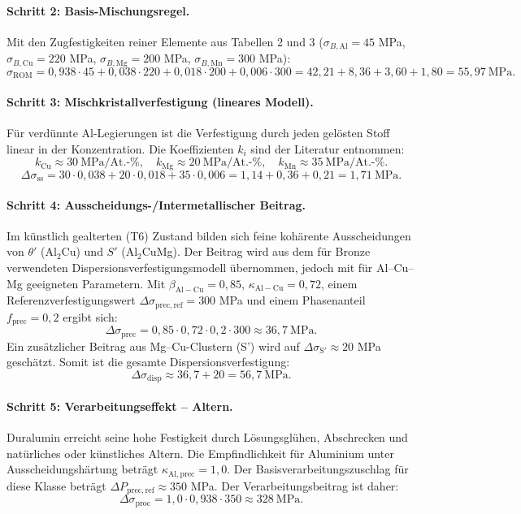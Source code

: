 \documentclass[12pt,a4paper]{article}
\begin{document}
\paragraph{Schritt 2: Basis-Mischungsregel.}
Mit den Zugfestigkeiten reiner Elemente aus Tabellen 2 und 3 (\(\sigma_{B,\mathrm{Al}}=45\) MPa, \(\sigma_{B,\mathrm{Cu}}=220\) MPa, \(\sigma_{B,\mathrm{Mg}}=200\) MPa, \(\sigma_{B,\mathrm{Mn}}=300\) MPa):
\[
\sigma_{\mathrm{ROM}} = 0,938\cdot45 + 0,038\cdot220 + 0,018\cdot200 + 0,006\cdot300
= 42,21 + 8,36 + 3,60 + 1,80 = 55,97\ \text{MPa}.
\]

\paragraph{Schritt 3: Mischkristallverfestigung (lineares Modell).}
Für verdünnte Al-Legierungen ist die Verfestigung durch jeden gelösten Stoff linear in der Konzentration. Die Koeffizienten \(k_i\) sind der Literatur entnommen:
\[
k_{\mathrm{Cu}} \approx 30\ \text{MPa/At.-\%},\quad
k_{\mathrm{Mg}} \approx 20\ \text{MPa/At.-\%},\quad
k_{\mathrm{Mn}} \approx 35\ \text{MPa/At.-\%}.
\]
\[
\Delta\sigma_{\mathrm{ss}} = 30\cdot0,038 + 20\cdot0,018 + 35\cdot0,006
= 1,14 + 0,36 + 0,21 = 1,71\ \text{MPa}.
\]

\paragraph{Schritt 4: Ausscheidungs-/Intermetallischer Beitrag.}
Im künstlich gealterten (T6) Zustand bilden sich feine kohärente Ausscheidungen von \(\theta'\) (Al\(_2\)Cu) und \(S'\) (Al\(_2\)CuMg). Der Beitrag wird aus dem für Bronze verwendeten Dispersionsverfestigungsmodell übernommen, jedoch mit für Al–Cu–Mg geeigneten Parametern. Mit \(\beta_{\mathrm{Al-Cu}}=0,85\), \(\kappa_{\mathrm{Al-Cu}}=0,72\), einem Referenzverfestigungswert \(\Delta\sigma_{\mathrm{prec,ref}}=300\) MPa und einem Phasenanteil \(f_{\mathrm{prec}}=0,2\) ergibt sich:
\[
\Delta\sigma_{\mathrm{prec}} = 0,85\cdot0,72\cdot0,2\cdot300 \approx 36,7\ \text{MPa}.
\]
Ein zusätzlicher Beitrag aus Mg–Cu-Clustern (S') wird auf \(\Delta\sigma_{\mathrm{S'}} \approx 20\) MPa geschätzt. Somit ist die gesamte Dispersionsverfestigung:
\[
\Delta\sigma_{\mathrm{disp}} \approx 36,7 + 20 = 56,7\ \text{MPa}.
\]

\paragraph{Schritt 5: Verarbeitungseffekt – Altern.}
Duralumin erreicht seine hohe Festigkeit durch Lösungsglühen, Abschrecken und natürliches oder künstliches Altern. Die Empfindlichkeit für Aluminium unter Ausscheidungshärtung beträgt \(\kappa_{\mathrm{Al,prec}}=1,0\). Der Basisverarbeitungszuschlag für diese Klasse beträgt \(\Delta P_{\mathrm{prec,ref}}\approx 350\) MPa. Der Verarbeitungsbeitrag ist daher:
\[
\Delta\sigma_{\mathrm{proc}} = 1,0\cdot0,938\cdot350 \approx 328\ \text{MPa}.
\]
\end{document}
